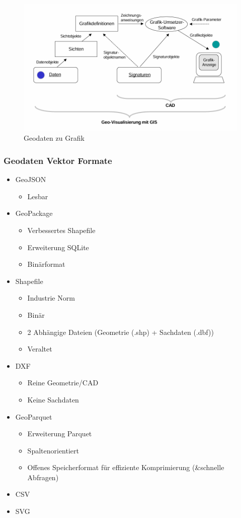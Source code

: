 \documentclass[../Main.tex]{subfiles}
\begin{document}
\begin{figure}[H]
    \centering
    \includegraphics[width=0.5\linewidth]{Images/geodaten-zu-grafik.png}
    \caption{Geodaten zu Grafik}
\end{figure}

\subsubsection{Geodaten Vektor Formate}
\begin{itemize}
    \item GeoJSON
        \begin{itemize}
            \item Lesbar
        \end{itemize}
    \item GeoPackage
        \begin{itemize}
            \item Verbessertes Shapefile
            \item Erweiterung SQLite
            \item Binärformat
        \end{itemize}
    \item Shapefile
        \begin{itemize}
            \item Industrie Norm
            \item Binär
            \item 2 Abhängige Dateien (Geometrie (.shp) + Sachdaten (.dbf))
            \item Veraltet
        \end{itemize}
    \item DXF
        \begin{itemize}
            \item Reine Geometrie/CAD
            \item Keine Sachdaten
        \end{itemize}
    \item GeoParquet
        \begin{itemize}
            \item Erweiterung Parquet
            \item Spaltenorientiert
            \item Offenes Speicherformat für effiziente Komprimierung (\&schnelle Abfragen)
        \end{itemize}
    \item CSV
    \item SVG
\end{itemize}
\end{document}
